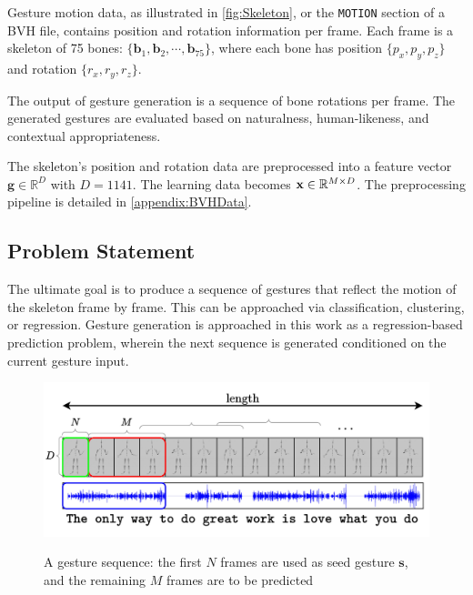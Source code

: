 Gesture motion data, as illustrated in \autoref{fig:Skeleton}, or the \texttt{MOTION} section of a BVH file, contains position and rotation information per frame. Each frame is a skeleton of 75 bones: $\{ \textbf{b}_{1}, \textbf{b}_{2}, \cdots , \textbf{b}_{75} \}$, where each bone has position $\{ p_{x}, p_{y}, p_{z} \}$ and rotation $\{ r_{x}, r_{y}, r_{z} \}$.

The output of gesture generation is a sequence of bone rotations per frame. The generated gestures are evaluated based on naturalness, human-likeness, and contextual appropriateness.

The skeleton's position and rotation data are preprocessed into a feature vector $\mathbf{g} \in \mathbb{R}^{D}$ with $D = 1141$. The learning data becomes $\mathbf{x} \in \mathbb{R}^{M \times D}$. The preprocessing pipeline is detailed in \autoref{appendix:BVHData}.

\subsection{Problem Statement}
\label{sec:ProblemStatement}

The ultimate goal is to produce a sequence of gestures that reflect the motion of the skeleton frame by frame. This can be approached via classification, clustering, or regression. Gesture generation is approached in this work as a regression-based prediction problem, wherein the next sequence is generated conditioned on the current gesture input.

\begin{figure}[h]
	\centering
	\href{https://www.youtube.com/watch?v=B6nv1kQmi-Q}{\includegraphics[width=\linewidth]{images/FeatureProcessing}}
	\caption{A gesture sequence: the first $N$ frames are used as seed gesture $\mathbf{s}$, and the remaining $M$ frames are to be predicted}
	\label{fig:GestureSeries}
\end{figure}

